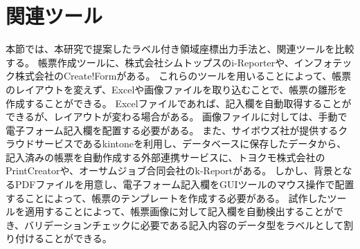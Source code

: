 







\section{関連ツール}\label{sec:relation_tools}
本節では、本研究で提案したラベル付き領域座標出力手法と、関連ツールを比較する。
帳票作成ツールに、株式会社シムトップスのi-Reporter\cite{i-Reporter}や、インフォテック株式会社のCreate!Form\cite{Create!Form}がある。
これらのツールを用いることによって、帳票のレイアウトを変えず、Excelや画像ファイルを取り込むことで、帳票の雛形を作成することができる。
Excelファイルであれば、記入欄を自動取得することができるが、レイアウトが変わる場合がある。
画像ファイルに対しては、手動で電子フォーム記入欄を配置する必要がある。
また、サイボウズ社が提供するクラウドサービスであるkintone\cite{kintone}を利用し、データベースに保存したデータから、記入済みの帳票を自動作成する外部連携サービスに、トヨクモ株式会社のPrintCreator\cite{PrintCreator}や、オーサムジョブ合同会社のk-Report\cite{k-Report}がある。
しかし、背景となるPDFファイルを用意し、電子フォーム記入欄をGUIツールのマウス操作で配置することによって、帳票のテンプレートを作成する必要がある。
試作したツールを適用することによって、帳票画像に対して記入欄を自動検出することができ、バリデーションチェックに必要である記入内容のデータ型をラベルとして割り付けることができる。

